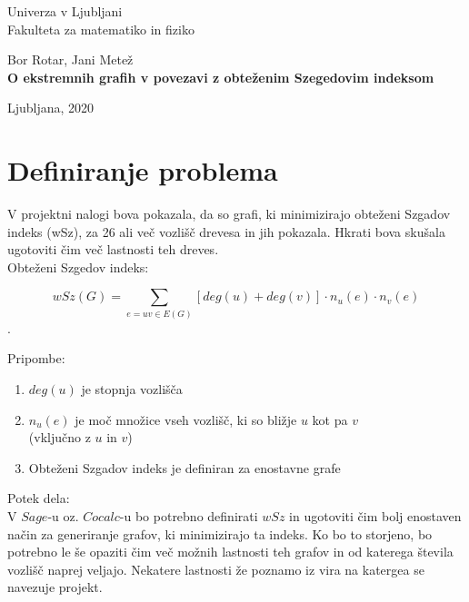 \documentclass[12pt, a4paper]{article}
\begin{document}
\begin{titlepage}
\begin{center}

\large
Univerza v Ljubljani\\
\normalsize
Fakulteta za matematiko in fiziko\\

\vspace{3 cm} 

\large
Bor Rotar, Jani Metež\\

\vspace{3 cm}
\LARGE
\textbf{O ekstremnih grafih v povezavi z obteženim Szegedovim indeksom}

\vfill

\large Ljubljana, 2020

\end{center}
\end{titlepage}

\newpage

\section[Definiranje problema]{Definiranje problema}

V projektni nalogi bova pokazala, da so grafi, ki minimizirajo obteženi Szgadov indeks (wSz), za 26 ali več vozlišč drevesa in jih pokazala. Hkrati bova skušala ugotoviti čim več lastnosti teh dreves.\\

Obteženi Szgedov indeks:
\begin{center}
 $$wSz(G) =\sum_{e=uv \in E(G)}[deg(u)+ deg(v) ]\cdot n_{u}(e)\cdot n_{v}(e)$$.
\end{center}
\medskip
Pripombe:
\begin{enumerate}
\item $deg(u)$ je stopnja vozlišča
\item $n_{u}(e)$ je moč množice vseh vozlišč, ki so bližje $u$ kot pa $v$ \\ (vključno z $u$ in $v$)
\item Obteženi Szgadov indeks je definiran za enostavne grafe
\end{enumerate}
\medskip

\medskip
Potek dela: \\

V $Sage$-u oz. $Cocalc$-u bo potrebno definirati $wSz$ in ugotoviti čim bolj enostaven način za generiranje grafov, ki minimizirajo ta indeks. Ko bo to storjeno, bo potrebno le še opaziti čim več možnih lastnosti teh grafov in od katerega števila vozlišč naprej veljajo. Nekatere lastnosti že poznamo iz vira na katergea se navezuje projekt.
\end{document}
